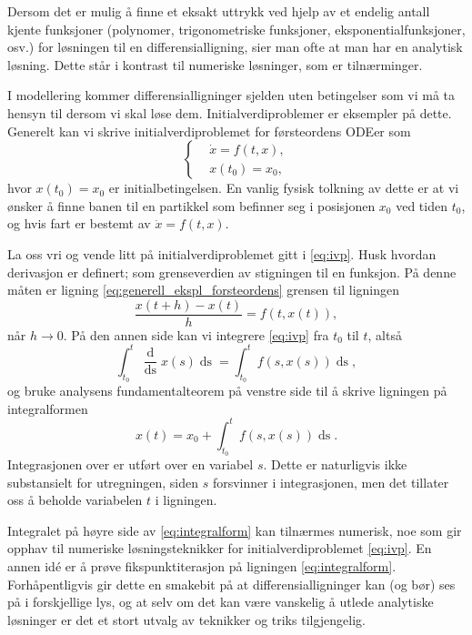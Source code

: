 \documentclass{article}
\theoremstyle{plain}
\theoremstyle{definition}
\theoremstyle{remark}
\newcommand{\diff}[1]{\mathop{d#1}}
\newcommand{\fcn}{x}
\begin{document}
Dersom det er mulig å finne et eksakt uttrykk ved hjelp av et endelig antall kjente funksjoner (polynomer, trigonometriske funksjoner, eksponentialfunksjoner, osv.) for løsningen til en differensialligning, sier man ofte at man har en analytisk løsning. Dette står i kontrast til numeriske løsninger, som er tilnærminger.

I modellering kommer differensialligninger sjelden uten betingelser som vi må ta hensyn til dersom vi skal løse dem. Initialverdiproblemer er eksempler på dette. Generelt kan vi skrive initialverdiproblemet for førsteordens ODEer som
\begin{equation} \label{eq:ivp}
    \left\{
    \begin{aligned}
            & \dot{\fcn} = f(t, \fcn), \\
            & \fcn(t_0) = \fcn_0,
    \end{aligned}
    \right.
\end{equation}
hvor $\fcn(t_0) = \fcn_0$ er initialbetingelsen. En vanlig fysisk tolkning av dette er at vi ønsker å finne banen til en partikkel som befinner seg i posisjonen $x_0$ ved tiden $t_0$, og hvis fart er bestemt av $\dot{\fcn} = f(t, \fcn)$.

La oss vri og vende litt på initialverdiproblemet gitt i \eqref{eq:ivp}. Husk hvordan derivasjon er definert; som grenseverdien av stigningen til en funksjon. På denne måten er ligning \eqref{eq:generell_ekspl_forsteordens} grensen til ligningen
\begin{equation*}
    \frac{\fcn(t + h) - \fcn(t)}{h} = f(t, \fcn(t)),
\end{equation*}
når $h \rightarrow 0$. På den annen side kan vi integrere \eqref{eq:ivp} fra $t_0$ til $t$, altså
\begin{equation*}
    \int_{t_0}^t \frac{\diff{}}{\diff{s}} \fcn(s) \diff{s} = \int_{t_0}^t f(s, \fcn(s)) \diff{s},
\end{equation*}
og bruke analysens fundamentalteorem på venstre side til å skrive ligningen på integralformen
\begin{equation} \label{eq:integralform}
    \fcn(t) = \fcn_0 + \int_{t_0}^{t} f(s, \fcn(s)) \diff{s}.
\end{equation}
Integrasjonen over er utført over en variabel $s$. Dette er naturligvis ikke substansielt for utregningen, siden $s$ forsvinner i integrasjonen, men det tillater oss å beholde variabelen $t$ i ligningen.

Integralet på høyre side av \eqref{eq:integralform} kan tilnærmes numerisk, noe som gir opphav til numeriske løsningsteknikker for initialverdiproblemet \eqref{eq:ivp}. En annen idé er å prøve fikspunktiterasjon på ligningen \eqref{eq:integralform}. Forhåpentligvis gir dette en smakebit på at differensialligninger kan (og bør) ses på i forskjellige lys, og at selv om det kan være vanskelig å utlede analytiske løsninger er det et stort utvalg av teknikker og triks tilgjengelig.
\end{document}
